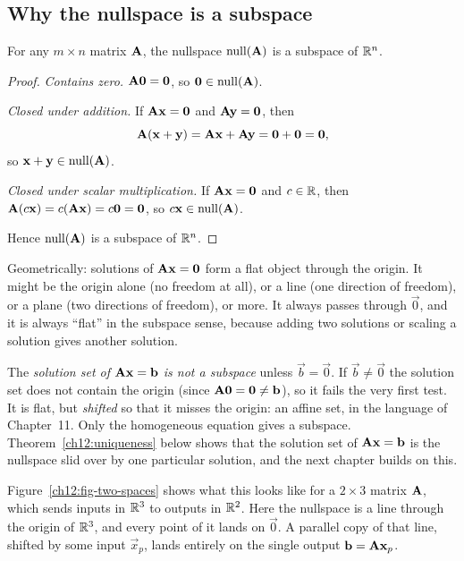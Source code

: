 \subsection{Why the nullspace is a subspace}

\begin{proposition}\label{ch12:nullspace-subspace}
For any $m\times n$ matrix $\mathbf{A}$, the nullspace $\operatorname{null}(\mathbf{A})$ is a
subspace of $\mathbb{R}^n$.
\end{proposition}

\begin{proof}
\emph{Contains zero.} $\mathbf{A}\mathbf{0}=\mathbf{0}$, so $\mathbf{0}\in\operatorname{null}(\mathbf{A})$.

\emph{Closed under addition.} If $\mathbf{A}\mathbf{x}=\mathbf{0}$ and
$\mathbf{A}\mathbf{y}=\mathbf{0}$, then
\[
  \mathbf{A}(\mathbf{x}+\mathbf{y}) = \mathbf{A}\mathbf{x}+\mathbf{A}\mathbf{y} = \mathbf{0}+\mathbf{0}
  = \mathbf{0},
\]
so $\mathbf{x}+\mathbf{y}\in\operatorname{null}(\mathbf{A})$.

\emph{Closed under scalar multiplication.} If $\mathbf{A}\mathbf{x}=\mathbf{0}$ and
$c\in\mathbb{R}$, then $\mathbf{A}(c\mathbf{x}) = c(\mathbf{A}\mathbf{x}) = c\mathbf{0} = \mathbf{0}$, so
$c\mathbf{x}\in\operatorname{null}(\mathbf{A})$.

Hence $\operatorname{null}(\mathbf{A})$ is a subspace of $\mathbb{R}^n$. \qedhere
\end{proof}

Geometrically: solutions of $\mathbf{A}\mathbf{x}=\mathbf{0}$ form a flat object through
the origin. It might be the origin alone (no freedom at all), or a
line (one direction of freedom), or a plane (two directions of freedom), or more. It always passes through $\vec{0}$, and it is always
``flat'' in the subspace sense, because adding two solutions or scaling a solution
gives another solution.

\begin{trapbox}
The \emph{solution set of $\mathbf{A}\mathbf{x}=\mathbf{b}$ is not a subspace} unless
$\vec{b}=\vec{0}$. If $\vec{b}\neq\vec{0}$ the solution set does not contain the
origin (since $\mathbf{A}\mathbf{0}=\mathbf{0}\neq\mathbf{b}$), so it fails the very first
test. It is flat, but \emph{shifted} so that it misses the origin:
an affine set, in the language of Chapter~11. Only the homogeneous equation gives a
subspace. Theorem~\ref{ch12:uniqueness} below shows that the solution set of
$\mathbf{A}\mathbf{x}=\mathbf{b}$ is the nullspace slid over by one particular
solution, and the next chapter builds on this.
\end{trapbox}

Figure~\ref{ch12:fig-two-spaces} shows what this looks like for a $2\times3$
matrix $\mathbf{A}$, which sends inputs in $\mathbb{R}^3$ to outputs in $\mathbb{R}^2$. Here the
nullspace is a line through the origin of $\mathbb{R}^3$, and every point of it lands
on $\vec{0}$. A parallel copy of that line, shifted by some input $\vec{x}_p$,
lands entirely on the single output $\mathbf{b}=\mathbf{A}\mathbf{x}_p$.

